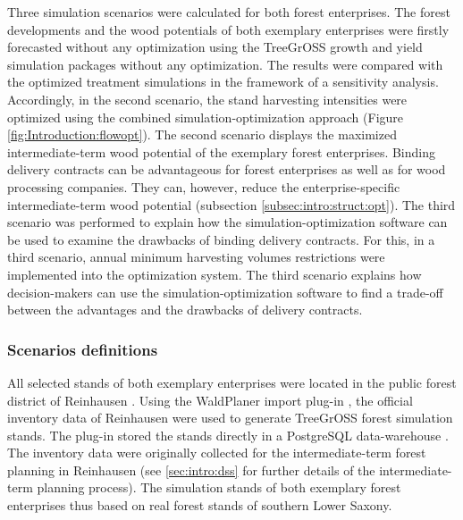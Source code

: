 Three simulation scenarios were calculated for both forest enterprises. The forest developments and the wood potentials of both exemplary enterprises were firstly forecasted without any optimization using the TreeGrOSS growth and yield simulation packages without any optimization. The results were compared with the optimized treatment simulations in the framework of a sensitivity analysis. Accordingly, in the second scenario, the stand harvesting intensities were optimized using the combined simulation-optimization approach (Figure \ref{fig:Introduction:flowopt}). The second scenario displays the maximized intermediate-term wood potential of the exemplary forest enterprises. Binding delivery contracts can be advantageous for forest enterprises as well as for wood processing companies. They can, however, reduce the enterprise-specific intermediate-term wood potential (subsection \ref{subsec:intro:struct:opt}). The third scenario was performed to explain how the si\-mu\-la\-tion-op\-ti\-mi\-za\-tion software can be used to examine the drawbacks of binding delivery contracts. For this, in a third scenario, annual minimum harvesting volumes restrictions were implemented into the optimization system. The third scenario explains how decision-makers can use the si\-mu\-la\-tion-op\-ti\-mi\-za\-tion software to find a trade-off between the advantages and the drawbacks of delivery contracts.

\subsubsection{Scenarios definitions}
\label{subsubsec:discussion:struct:opt:application:method}
All selected stands of both exemplary enterprises were located in the public forest district of Reinhausen \citep{nlf_2017}. Using the WaldPlaner import plug-in \citep[p. 58]{hansen_2014}, the official inventory data of Reinhausen were used to generate TreeGrOSS forest simulation stands. The plug-in stored the stands directly in a PostgreSQL data-warehouse \citep{eisentraut_2003}. The inventory data were originally collected for the intermediate-term forest planning in Reinhausen (see \ref{sec:intro:dss} for further details of the intermediate-term planning process). The simulation stands of both exemplary forest enterprises thus based on real forest stands of southern Lower Saxony.

